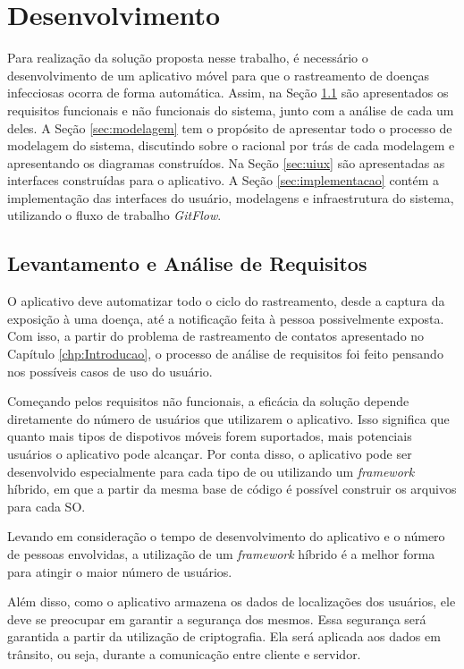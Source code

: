 \chapter{Desenvolvimento}\label{chp:desenvolvimento}

Para realização da solução proposta nesse trabalho, é necessário o desenvolvimento de um aplicativo móvel para que o rastreamento de doenças infecciosas ocorra de forma automática. Assim, na Seção \ref{sec:requisitos} são apresentados os requisitos funcionais e não funcionais do sistema, junto com a análise de cada um deles. A Seção \ref{sec:modelagem} tem o propósito de apresentar todo o processo de modelagem do sistema, discutindo sobre o racional por trás de cada modelagem e apresentando os diagramas construídos. Na Seção \ref{sec:uiux} são apresentadas as interfaces construídas para o aplicativo. A Seção \ref{sec:implementacao} contém a implementação das interfaces do usuário, modelagens e infraestrutura do sistema, utilizando o fluxo de trabalho \textit{GitFlow}.

\section{Levantamento e Análise de Requisitos}\label{sec:requisitos}
O aplicativo deve automatizar todo o ciclo do rastreamento, desde a captura da exposição à uma doença, até a notificação feita à pessoa possivelmente exposta. Com isso, a partir do problema de rastreamento de contatos apresentado no Capítulo \ref{chp:Introducao}, o processo de análise de requisitos foi feito pensando nos possíveis casos de uso do usuário.

Começando pelos requisitos não funcionais, a eficácia da solução depende diretamente do número de usuários que utilizarem o aplicativo. Isso significa que quanto mais tipos de dispotivos móveis forem suportados, mais potenciais usuários o aplicativo pode alcançar. Por conta disso, o aplicativo pode ser desenvolvido especialmente para cada tipo de  ou utilizando um \textit{framework} híbrido, em que a partir da mesma base de código é possível construir os arquivos para cada SO.

Levando em consideração o tempo de desenvolvimento do aplicativo e o número de pessoas envolvidas, a utilização de um \textit{framework} híbrido é a melhor forma para atingir o maior número de usuários.

Além disso, como o aplicativo armazena os dados de localizações dos usuários, ele deve se preocupar em garantir a segurança dos mesmos. Essa segurança será garantida a partir da utilização de criptografia. Ela será aplicada aos dados em trânsito, ou seja, durante a comunicação entre cliente e servidor.

